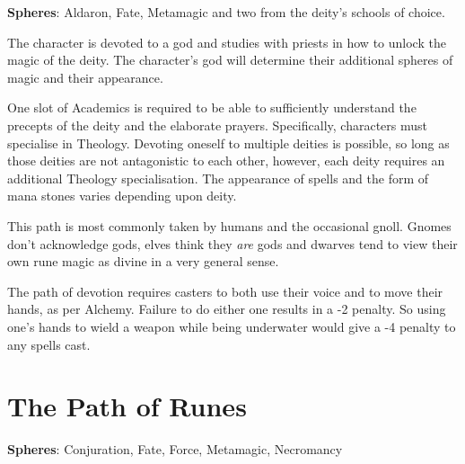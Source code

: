 \documentclass[titlepage,a4paper,openany]{book}
\begin{document}
\begin{multicols}{2}

\textbf{Spheres}: Aldaron, Fate, Metamagic and two from the deity's schools of choice.

\noindent The character is devoted to a god and studies with priests in how to unlock the magic of the deity. The character's god will determine their additional spheres of magic and their appearance.

One slot of Academics is required to be able to sufficiently understand the precepts of the deity and the elaborate prayers. Specifically, characters must specialise in Theology. Devoting oneself to multiple deities is possible, so long as those deities are not antagonistic to each other, however, each deity requires an additional Theology specialisation. The appearance of spells and the form of mana stones varies depending upon deity.

This path is most commonly taken by humans and the occasional gnoll. Gnomes don't acknowledge gods, elves think they \emph{are} gods and dwarves tend to view their own rune magic as divine in a very general sense.

The path of devotion requires casters to both use their voice and to move their hands, as per Alchemy. Failure to do either one results in a -2 penalty. So using one's hands to wield a weapon while being underwater would give a -4 penalty to any spells cast.

\end{multicols}

\section{The Path of Runes}

\textbf{Spheres}: Conjuration, Fate, Force, Metamagic, Necromancy
\end{document}

